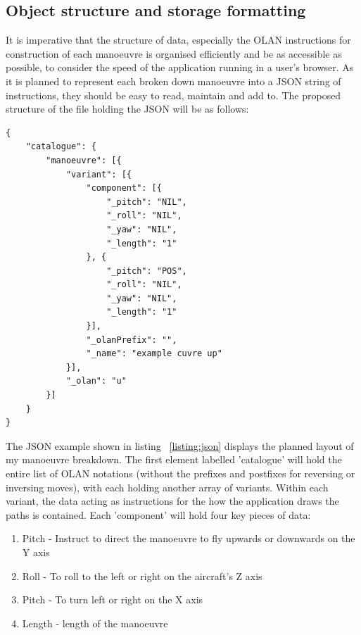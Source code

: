 \clearpage

\subsection{Object structure and storage formatting}
It is imperative that the structure of data, especially the OLAN instructions for construction of each manoeuvre is organised efficiently and be as accessible as possible, to consider the speed of the application running in a user's browser. As it is planned to represent each broken down manoeuvre into a JSON string of instructions, they should be easy to read, maintain and add to. The proposed structure of the file holding the JSON will be as follows:

\lstset{language=JavaScript}
\medskip
\begin{lstlisting}[caption=A JSON means of holding break downs of manoeuvres with each one holding information on different variants of the move such as inverse and reverse and description of the OLAN notation]
{
    "catalogue": {
        "manoeuvre": [{
            "variant": [{
                "component": [{
                    "_pitch": "NIL",
                    "_roll": "NIL",
                    "_yaw": "NIL",
                    "_length": "1"
                }, {
                    "_pitch": "POS",
                    "_roll": "NIL",
                    "_yaw": "NIL",
                    "_length": "1"
                }],
                "_olanPrefix": "",
                "_name": "example cuvre up"
            }],
            "_olan": "u"
        }]
    }
}
\end{lstlisting}
\label{listing:json}

The JSON example shown in listing ~\ref{listing:json} displays the planned layout of my manoeuvre breakdown. The first element labelled 'catalogue' will hold the entire list of OLAN notations (without the prefixes and postfixes for reversing or inversing moves), with each holding another array of variants. Within each variant, the data acting as instructions for the how the application draws the paths is contained. Each 'component' will hold four key pieces of data:

\begin{enumerate}
  \item Pitch - Instruct to direct the manoeuvre to fly upwards or downwards on the Y axis
  \item Roll - To roll to the left or right on the aircraft's Z axis
  \item Pitch - To turn left or right on the X axis
  \item Length - length of the manoeuvre
\end{enumerate}

